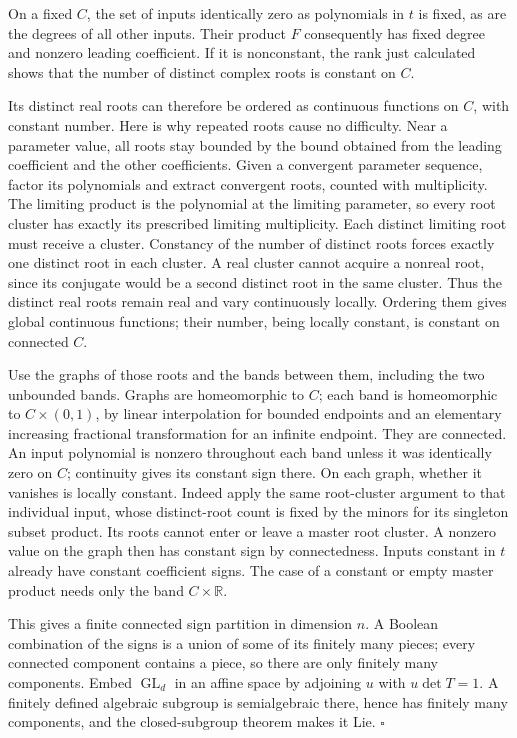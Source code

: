 \documentclass[
  11pt,
]{article}
\begin{document}
On a fixed \(C\), the set of inputs identically zero as polynomials in
\(t\) is fixed, as are the degrees of all other inputs. Their product
\(F\) consequently has fixed degree and nonzero leading coefficient. If
it is nonconstant, the rank just calculated shows that the number of
distinct complex roots is constant on \(C\).

Its distinct real roots can therefore be ordered as continuous functions
on \(C\), with constant number. Here is why repeated roots cause no
difficulty. Near a parameter value, all roots stay bounded by the bound
obtained from the leading coefficient and the other coefficients. Given
a convergent parameter sequence, factor its polynomials and extract
convergent roots, counted with multiplicity. The limiting product is the
polynomial at the limiting parameter, so every root cluster has exactly
its prescribed limiting multiplicity. Each distinct limiting root must
receive a cluster. Constancy of the number of distinct roots forces
exactly one distinct root in each cluster. A real cluster cannot acquire
a nonreal root, since its conjugate would be a second distinct root in
the same cluster. Thus the distinct real roots remain real and vary
continuously locally. Ordering them gives global continuous functions;
their number, being locally constant, is constant on connected \(C\).

Use the graphs of those roots and the bands between them, including the
two unbounded bands. Graphs are homeomorphic to \(C\); each band is
homeomorphic to \(C\times(0,1)\), by linear interpolation for bounded
endpoints and an elementary increasing fractional transformation for an
infinite endpoint. They are connected. An input polynomial is nonzero
throughout each band unless it was identically zero on \(C\); continuity
gives its constant sign there. On each graph, whether it vanishes is
locally constant. Indeed apply the same root-cluster argument to that
individual input, whose distinct-root count is fixed by the minors for
its singleton subset product. Its roots cannot enter or leave a master
root cluster. A nonzero value on the graph then has constant sign by
connectedness. Inputs constant in \(t\) already have constant
coefficient signs. The case of a constant or empty master product needs
only the band \(C\times\mathbb R\).

This gives a finite connected sign partition in dimension \(n\). A
Boolean combination of the signs is a union of some of its finitely many
pieces; every connected component contains a piece, so there are only
finitely many components. Embed \(\operatorname{GL}_d\) in an affine
space by adjoining \(u\) with \(u\det T=1\). A finitely defined
algebraic subgroup is semialgebraic there, hence has finitely many
components, and the closed-subgroup theorem makes it Lie. \(\square\)
\end{document}
